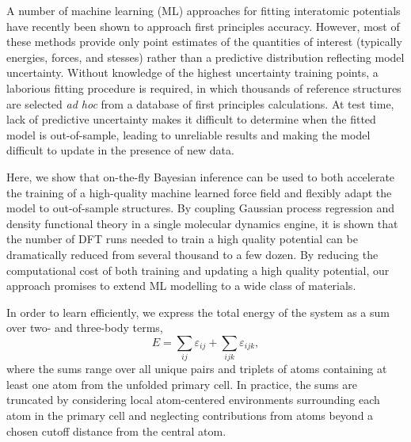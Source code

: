 \documentclass[%
reprint,
superscriptaddress,
amsmath,amssymb,
aps,
prl,
]{revtex4-1}
\begin{document}
A number of machine learning (ML) approaches for fitting interatomic potentials have recently been shown to approach first principles accuracy. However, most of these methods provide only point estimates of the quantities of interest (typically energies, forces, and stesses) rather than a predictive distribution reflecting model uncertainty. Without knowledge of the highest uncertainty training points, a laborious fitting procedure is required, in which thousands of reference structures are selected \textit{ad hoc} from a database of first principles calculations. At test time, lack of predictive uncertainty makes it difficult to determine when the fitted model is out-of-sample, leading to unreliable results and making the model difficult to update in the presence of new data.

Here, we show that on-the-fly Bayesian inference can be used to both accelerate the training of a high-quality machine learned force field and flexibly adapt the model to out-of-sample structures. By coupling Gaussian process regression and density functional theory in a single molecular dynamics engine, it is shown that the number of DFT runs needed to train a high quality potential can be dramatically reduced from several thousand to a few dozen. By reducing the computational cost of both training and updating a high quality potential, our approach promises to extend ML modelling to a wide class of materials.

In order to learn efficiently, we express the total energy of the system as a sum over two- and three-body terms,
\begin{equation}
E = \sum_{ij} \varepsilon_{ij} + \sum_{ijk} \varepsilon_{ijk},
\end{equation}
where the sums range over all unique pairs and triplets of atoms containing at least one atom from the unfolded primary cell. In practice, the sums are truncated by considering local atom-centered environments surrounding each atom in the primary cell and neglecting contributions from atoms beyond a chosen cutoff distance from the central atom.




\end{document}
